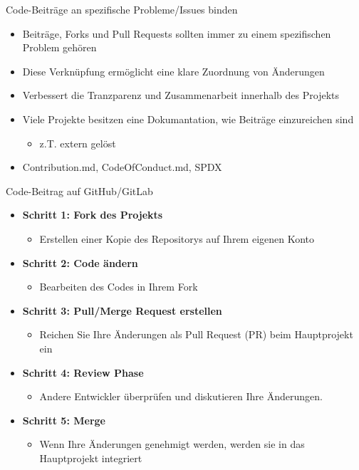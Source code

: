 \documentclass[compress,aspectratio=169]{beamer}
\begin{document}
	\begin{frame}{Code-Beiträge an spezifische Probleme/Issues binden}
		\begin{itemize}
			\item Beiträge, Forks und Pull Requests sollten immer zu einem spezifischen Problem gehören
			\item Diese Verknüpfung ermöglicht eine klare Zuordnung von Änderungen
			\item Verbessert die Tranzparenz und Zusammenarbeit innerhalb des Projekts
			\vspace{2em}
			\item Viele Projekte besitzen eine Dokumantation, wie Beiträge einzureichen sind
			\begin{itemize}
				\item z.T. extern gelöst
			\end{itemize}
			\vspace{2em}
			\item Contribution.md, CodeOfConduct.md, SPDX
		\end{itemize}
	\end{frame}
	
	\begin{frame}{Code-Beitrag auf GitHub/GitLab}
		\begin{itemize}
			\item \textbf{Schritt 1: Fork des Projekts}
				\begin{itemize}
					\item Erstellen einer Kopie des Repositorys auf Ihrem eigenen Konto
				\end{itemize}
			\item \textbf{Schritt 2: Code ändern}
				\begin{itemize}
					\item Bearbeiten des Codes in Ihrem Fork
				\end{itemize}
			\item \textbf{Schritt 3: Pull/Merge Request erstellen}
				\begin{itemize}
					\item Reichen Sie Ihre Änderungen als Pull Request (PR) beim Hauptprojekt ein
				\end{itemize}
			\item \textbf{Schritt 4: Review Phase}
				\begin{itemize}
					\item Andere Entwickler überprüfen und diskutieren Ihre Änderungen.
				\end{itemize}
			\item \textbf{Schritt 5: Merge}
				\begin{itemize}
					\item Wenn Ihre Änderungen genehmigt werden, werden sie in das Hauptprojekt integriert
				\end{itemize}
		\end{itemize}
	\end{frame}	
	
\end{document}
